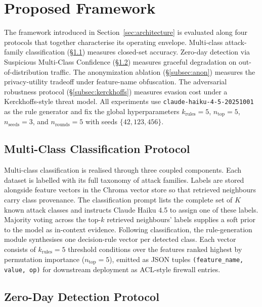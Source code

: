 \section{Proposed Framework}
\label{sec:framework}

The framework introduced in Section~\ref{sec:architecture} is evaluated along
four protocols that together characterise its operating envelope. Multi-class
attack-family classification (\S\ref{subsec:multiclass}) measures closed-set
accuracy. Zero-day detection via Suspicious Multi-Class Confidence
(\S\ref{subsec:zeroday}) measures graceful degradation on out-of-distribution
traffic. The anonymization ablation (\S\ref{subsec:anon}) measures the
privacy-utility tradeoff under feature-name obfuscation. The adversarial
robustness protocol (\S\ref{subsec:kerckhoffs}) measures evasion cost under a
Kerckhoffs-style threat model. All experiments use
\texttt{claude-haiku-4-5-20251001} as the rule generator and fix the global
hyperparameters $k_{\text{rules}}=5$, $n_{\text{top}}=5$, $n_{\text{seeds}}=3$,
and $n_{\text{rounds}}=5$ with seeds $\{42, 123, 456\}$.

\subsection{Multi-Class Classification Protocol}
\label{subsec:multiclass}

Multi-class classification is realised through three coupled components. Each
dataset is labelled with its full taxonomy of attack families. Labels are
stored alongside feature vectors in the Chroma vector store so that retrieved
neighbours carry class provenance. The classification prompt lists the
complete set of $K$ known attack classes and instructs Claude Haiku 4.5 to
assign one of these labels. Majority voting across the top-$k$ retrieved
neighbours' labels supplies a soft prior to the model as in-context evidence.
Following classification, the rule-generation module synthesises one
decision-rule vector per detected class. Each vector consists of
$k_{\text{rules}}=5$ threshold conditions over the features ranked highest by
permutation importance ($n_{\text{top}}=5$), emitted as JSON tuples
\texttt{(feature\_name, value, op)} for downstream deployment as ACL-style
firewall entries.

\subsection{Zero-Day Detection Protocol}
\label{subsec:zeroday}

